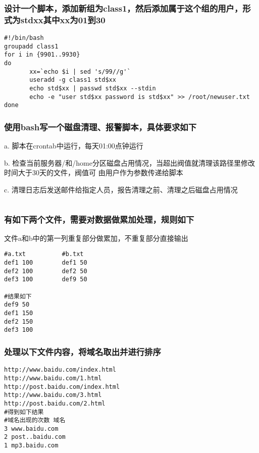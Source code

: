\documentclass{article}
\begin{document}
\subsubsection{设计一个脚本，添加新组为class1，然后添加属于这个组的用户，形式为stdxx其中xx为01到30
 }
\begin{verbatim}
#!/bin/bash
groupadd class1
for i in {9901..9930}
do
       xx=`echo $i | sed 's/99//g'`
       useradd -g class1 std$xx
       echo std$xx | passwd std$xx --stdin
       echo -e "user std$xx password is std$xx" >> /root/newuser.txt
done

\end{verbatim}

\subsubsection{使用bash写一个磁盘清理、报警脚本，具体要求如下}
a. 脚本在crontab中运行，每天01:00点钟运行


b. 检查当前服务器/和/home分区磁盘占用情况，当超出阀值就清理该路径里修改时间大于30天的文件，阀值可
由用户作为参数传递给脚本


c. 清理日志后发送邮件给指定人员，报告清理之前、清理之后磁盘占用情况

\begin{verbatim}

\end{verbatim}

\subsubsection{有如下两个文件，需要对数据做累加处理，规则如下}
文件a和b中的第一列重复部分做累加，不重复部分直接输出



\begin{verbatim}
#a.txt			#b.txt
def1 100		def1 50
def2 100		def2 50
def3 100		def9 50

#结果如下
def9 50
def1 150
def2 150
def3 100
\end{verbatim}

\subsubsection{处理以下文件内容，将域名取出并进行排序}
\begin{verbatim}
http://www.baidu.com/index.html
http://www.baidu.com/1.html
http://post.baidu.com/index.html
http://www.baidu.com/3.html
http://post.baidu.com/2.html
#得到如下结果
#域名出现的次数 域名
3 www.baidu.com
2 post..baidu.com
1 mp3.baidu.com

\end{verbatim}
\end{document}

